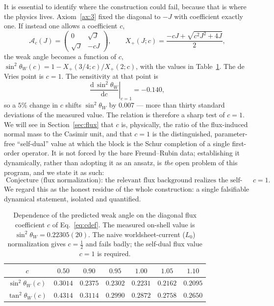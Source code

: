 \documentclass[11pt]{article}
\theoremstyle{plain}
\theoremstyle{definition}
\newcommand{\cA}{\mathcal{A}}
\newcommand{\Xp}{X_{+}}
\newcommand{\sinsq}{\sin^{2}\theta_W}
\newcommand{\dd}{\mathrm{d}}
\begin{document}
It is essential to identify where the construction could fail, because that
is where the physics lives. Axiom~\ref{ax:3} fixed the diagonal to $-J$
with coefficient exactly one. If instead one allows a coefficient $c$,
\begin{equation}
\cA_c(J)=
\begin{pmatrix}0&\sqrt J\\ \sqrt J&-cJ\end{pmatrix},
\qquad
\Xp(J;c)=\frac{-cJ+\sqrt{c^2J^2+4J}}{2},
\label{eq:cdef}
\end{equation}
the weak angle becomes a function of $c$,
$\sinsq(c)=1-\Xp(3/4;c)/\Xp(2;c)$, with the values in
Table~\ref{tab:cscan}. The de Vries point is $c=1$. The sensitivity at that
point is
\begin{equation}
\left.\frac{\dd\,\sinsq}{\dd c}\right|_{c=1}=-0.140,
\label{eq:sensitivity}
\end{equation}
so a $5\%$ change in $c$ shifts $\sinsq$ by $0.007$ --- more than thirty
standard deviations of the measured value. The relation is therefore a sharp test of
$c=1$. We will see in Section~\ref{sec:flux} that $c$ is, physically, the
ratio of the flux-induced normal mass to the Casimir unit, and that $c=1$ is
the distinguished, parameter-free ``self-dual'' value at which the block is
the Schur completion of a single first-order operator. It is not forced by
the bare Freund--Rubin data; establishing it dynamically, rather than
adopting it as an ansatz, is \emph{the} open problem of this program, and we
state it as such:
\begin{equation}
\boxed{\;\text{Conjecture (flux normalization): the relevant flux background
realizes the self-dual point }c=1.\;}
\label{eq:conehypothesis}
\end{equation}
We regard this as the honest residue of the whole construction: a single
falsifiable dynamical statement, isolated and quantified.

\begin{table}[t]
\centering
\begin{tabular}{ccccccc}
\toprule
$c$ & $0.50$ & $0.90$ & $0.95$ & $1.00$ & $1.05$ & $1.10$\\
\midrule
$\sinsq(c)$ & $0.3014$ & $0.2375$ & $0.2302$ & $\mathbf{0.2231}$ & $0.2162$ & $0.2095$\\
$\tan^2\theta_W(c)$ & $0.4314$ & $0.3114$ & $0.2990$ & $\mathbf{0.2872}$ & $0.2758$ & $0.2650$\\
\bottomrule
\end{tabular}
\caption{Dependence of the predicted weak angle on the diagonal flux
coefficient $c$ of Eq.~\eqref{eq:cdef}. The measured on-shell value is
$\sinsq=0.22305(20)$. The naive worldsheet-current ($L_0$) normalization
gives $c=\tfrac12$ and fails badly; the self-dual flux value $c=1$ is
required.}
\label{tab:cscan}
\end{table}
\end{document}
